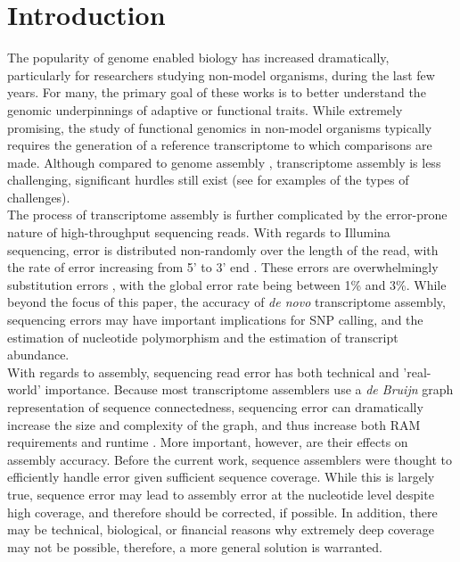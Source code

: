 \documentclass[11pt]{article}
\begin{document}
\linenumbers

\section*{Introduction}

\doublespacing
\noindent
The popularity of genome enabled biology has increased dramatically, particularly for researchers studying non-model organisms, during the last few years.  For many, the primary goal of these works is to better understand the genomic underpinnings of adaptive \citep{Linnen:2013ir,Narum:2013kc} or functional \citep{MunozMerida:2013dw,Hsu:2012dg} traits. While extremely promising, the study of functional genomics in non-model organisms typically requires the generation of a reference transcriptome to which comparisons are made.  Although compared to genome assembly \citep{Bradnam:2013uu,Earl:2011gt}, transcriptome assembly is less challenging, significant hurdles still exist (see \cite{Francis:2013gc,Vijay:2012gy,Pyrkosz:2013tm} for examples of the types of challenges). \\

\noindent
The process of transcriptome assembly is further complicated by the error-prone nature of high-throughput sequencing reads.  With regards to Illumina sequencing, error is distributed non-randomly over the length of the read, with the rate of error increasing from 5' to 3' end \citep{Liu:2012iv}. These errors are overwhelmingly substitution errors \citep{Yang:2013ck}, with the global error rate being between 1\% and 3\%.    While beyond the focus of this paper, the accuracy of \textit{de novo} transcriptome assembly, sequencing errors may have important implications for SNP calling, and the estimation of nucleotide polymorphism and the estimation of transcript abundance. \\

\noindent
With regards to assembly, sequencing read error has both technical and 'real-world' importance. Because most transcriptome assemblers use a \textit{de Bruijn} graph representation of sequence connectedness, sequencing error can dramatically increase the size and complexity of the graph, and thus increase both RAM requirements and runtime \citep{Conway:2011iv,Pell:2012id}. More important, however, are their effects on assembly accuracy. Before the current work, sequence assemblers were thought to efficiently handle error given sufficient sequence coverage. While this is largely true, sequence error may lead to assembly error at the nucleotide level despite high coverage, and therefore should be corrected, if possible. In addition, there may be technical, biological, or financial reasons why extremely deep coverage may not be possible, therefore, a more general solution is warranted.  \\ 
\end{document}
